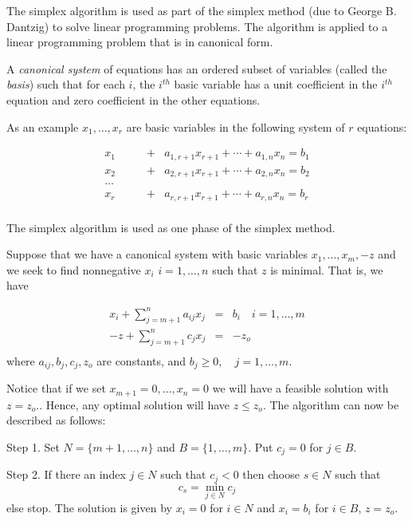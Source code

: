 \documentclass[12pt]{article}
\begin{document}
The simplex algorithm is  used as part of the simplex
method (due to George B. Dantzig) to solve linear programming problems.
The algorithm  is applied to a linear programming problem that
is in canonical form. 

A \emph{canonical system} of equations has an ordered subset of variables
(called the \emph{basis}) such that for each $i$, the $i^{th}$ basic 
variable has a unit coefficient in the $i^{th}$ equation and zero coefficient
in the other equations.

As an example $x_1, \ldots , x_r$ are basic variables in the following
system of $r$ equations:

\begin{eqnarray*}
x_1 \quad \quad &+& a_{1,r+1}x_{r+1} + \cdots + a_{1,n}x_n = b_1 \\
x_2 \quad  &+& a_{2,r+1}x_{r+1}+ \cdots + a_{2,n}x_n = b_2 \\
\ldots \\
x_r   &+& a_{r,r+1}x_{r+1} + \cdots + a_{r,n}x_n = b_r \\
\end{eqnarray*}



The simplex algorithm is used as one phase of the simplex method.

Suppose that we have a canonical system with basic variables 
$x_1, \ldots, x_m, -z$ and we seek to find nonnegative $x_i$ $i=1, \ldots, n$
such that $z$ is minimal. That is, we have

\begin{eqnarray*}
x_i + \sum_{j=m+1}^n a_{ij} x_j &=& b_i \quad i=1, \ldots, m \\
-z + \sum_{j=m+1}^n c_j x_j &=& -z_o \\
\end{eqnarray*}
where $a_{ij}, b_j , c_j , z_o$ are constants, 
and $b_j \geq 0, \quad j=1,\ldots, m$.

Notice that if we set $x_{m+1} = 0, \ldots, x_n = 0$ we will have a feasible
solution with $z=z_o.$. Hence, any optimal solution will have
$z \leq z_o$. 
The algorithm can now be described as follows:

Step 1. Set $N = \{m+1, \ldots , n\}$ and $B=\{1, \ldots, m\}$.
Put $c_j = 0$ for $j\in B$.

Step 2. If there an index $j \in N$ such that $c_j < 0$ then
choose $s \in N$ such that 
$$
c_s = \operatorname{min}_{j \in N} c_j 
$$
else
stop. The solution is given by $x_i = 0$ for $i \in N$ and 
$x_i = b_i$ for $i \in B$, $z=z_o$.
\end{document}

